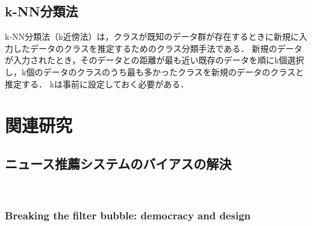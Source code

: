 \documentclass[12pt,a4j]{jreport}
\begin{document}


\section{k-NN分類法}
k-NN分類法（k近傍法）は，クラスが既知のデータ群が存在するときに新規に入力したデータのクラスを推定するためのクラス分類手法である\cite{aurellen20}．
新規のデータが入力されたとき，そのデータとの距離が最も近い既存のデータを順にk個選択し，k個のデータのクラスのうち最も多かったクラスを新規のデータのクラスと推定する．
kは事前に設定しておく必要がある．


\chapter{関連研究}


\section{ニュース推薦システムのバイアスの解決}
~

\subsection{Breaking the filter bubble: democracy and design}
~
\end{document}
